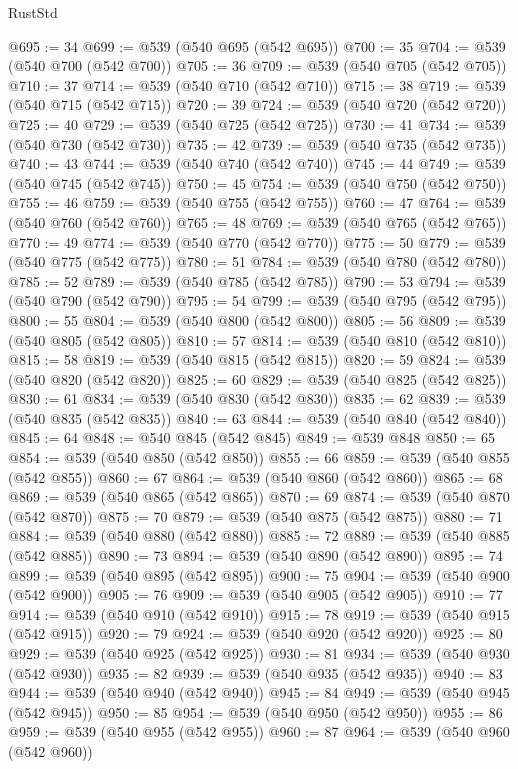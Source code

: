 \begin{lexlean}{RustStd}
\begin{coremodule}
@695 := 34
@699 := @539 (@540 @695 (@542 @695))
@700 := 35
@704 := @539 (@540 @700 (@542 @700))
@705 := 36
@709 := @539 (@540 @705 (@542 @705))
@710 := 37
@714 := @539 (@540 @710 (@542 @710))
@715 := 38
@719 := @539 (@540 @715 (@542 @715))
@720 := 39
@724 := @539 (@540 @720 (@542 @720))
@725 := 40
@729 := @539 (@540 @725 (@542 @725))
@730 := 41
@734 := @539 (@540 @730 (@542 @730))
@735 := 42
@739 := @539 (@540 @735 (@542 @735))
@740 := 43
@744 := @539 (@540 @740 (@542 @740))
@745 := 44
@749 := @539 (@540 @745 (@542 @745))
@750 := 45
@754 := @539 (@540 @750 (@542 @750))
@755 := 46
@759 := @539 (@540 @755 (@542 @755))
@760 := 47
@764 := @539 (@540 @760 (@542 @760))
@765 := 48
@769 := @539 (@540 @765 (@542 @765))
@770 := 49
@774 := @539 (@540 @770 (@542 @770))
@775 := 50
@779 := @539 (@540 @775 (@542 @775))
@780 := 51
@784 := @539 (@540 @780 (@542 @780))
@785 := 52
@789 := @539 (@540 @785 (@542 @785))
@790 := 53
@794 := @539 (@540 @790 (@542 @790))
@795 := 54
@799 := @539 (@540 @795 (@542 @795))
@800 := 55
@804 := @539 (@540 @800 (@542 @800))
@805 := 56
@809 := @539 (@540 @805 (@542 @805))
@810 := 57
@814 := @539 (@540 @810 (@542 @810))
@815 := 58
@819 := @539 (@540 @815 (@542 @815))
@820 := 59
@824 := @539 (@540 @820 (@542 @820))
@825 := 60
@829 := @539 (@540 @825 (@542 @825))
@830 := 61
@834 := @539 (@540 @830 (@542 @830))
@835 := 62
@839 := @539 (@540 @835 (@542 @835))
@840 := 63
@844 := @539 (@540 @840 (@542 @840))
@845 := 64
@848 := @540 @845 (@542 @845)
@849 := @539 @848
@850 := 65
@854 := @539 (@540 @850 (@542 @850))
@855 := 66
@859 := @539 (@540 @855 (@542 @855))
@860 := 67
@864 := @539 (@540 @860 (@542 @860))
@865 := 68
@869 := @539 (@540 @865 (@542 @865))
@870 := 69
@874 := @539 (@540 @870 (@542 @870))
@875 := 70
@879 := @539 (@540 @875 (@542 @875))
@880 := 71
@884 := @539 (@540 @880 (@542 @880))
@885 := 72
@889 := @539 (@540 @885 (@542 @885))
@890 := 73
@894 := @539 (@540 @890 (@542 @890))
@895 := 74
@899 := @539 (@540 @895 (@542 @895))
@900 := 75
@904 := @539 (@540 @900 (@542 @900))
@905 := 76
@909 := @539 (@540 @905 (@542 @905))
@910 := 77
@914 := @539 (@540 @910 (@542 @910))
@915 := 78
@919 := @539 (@540 @915 (@542 @915))
@920 := 79
@924 := @539 (@540 @920 (@542 @920))
@925 := 80
@929 := @539 (@540 @925 (@542 @925))
@930 := 81
@934 := @539 (@540 @930 (@542 @930))
@935 := 82
@939 := @539 (@540 @935 (@542 @935))
@940 := 83
@944 := @539 (@540 @940 (@542 @940))
@945 := 84
@949 := @539 (@540 @945 (@542 @945))
@950 := 85
@954 := @539 (@540 @950 (@542 @950))
@955 := 86
@959 := @539 (@540 @955 (@542 @955))
@960 := 87
@964 := @539 (@540 @960 (@542 @960))

\end{coremodule}
\end{lexlean}

